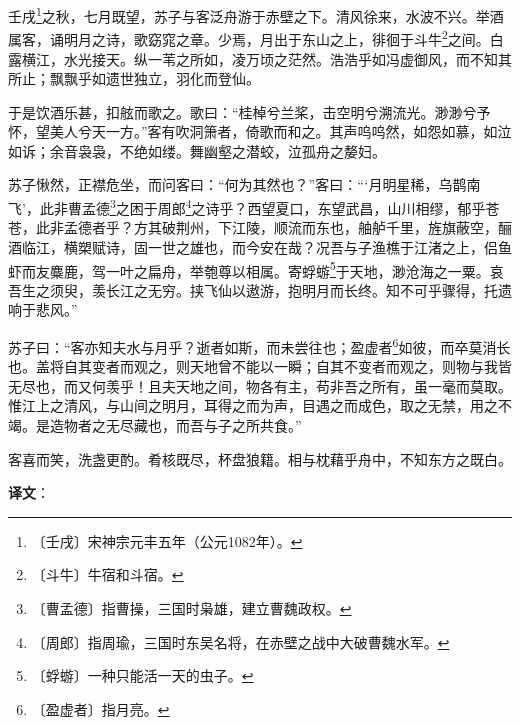 \documentclass[12pt,UTF-8,openany,a4]{ctexbook}
\begin{document}
\begin{large}
    
    壬戌\footnote{〔壬戌〕\yiwen 宋神宗元丰五年（公元1082年）。}之秋，七月既望，苏子与客泛舟游于赤壁之下。清风徐来，水波不兴。举酒属客，诵明月之诗，歌窈窕之章。少焉，月出于东山之上，徘徊于斗牛\footnote{〔斗牛〕\yiwen 牛宿和斗宿。}之间。白露横江，水光接天。纵一苇之所如，凌万顷之茫然。浩浩乎如冯虚御风，而不知其所止；飘飘乎如遗世独立，羽化而登仙。
    
    于是饮酒乐甚，扣舷而歌之。歌曰：“桂棹兮兰桨，击空明兮溯流光。渺渺兮予怀，望美人兮天一方。”客有吹洞箫者，倚歌而和之。其声呜呜然，如怨如慕，如泣如诉；余音袅袅，不绝如缕。舞幽壑之潜蛟，泣孤舟之嫠妇。
    
    苏子愀然，正襟危坐，而问客曰：“何为其然也？”客曰：“‘月明星稀，乌鹊南飞’，此非曹孟德\footnote{〔曹孟德〕\yiwen 指曹操，三国时枭雄，建立曹魏政权。}之困于周郎\footnote{〔周郎〕\yiwen 指周瑜，三国时东吴名将，在赤壁之战中大破曹魏水军。}之诗乎？西望夏口，东望武昌，山川相缪，郁乎苍苍，此非孟德者乎？方其破荆州，下江陵，顺流而东也，舳舻千里，旌旗蔽空，酾酒临江，横槊赋诗，固一世之雄也，而今安在哉？况吾与子渔樵于江渚之上，侣鱼虾而友麋鹿，驾一叶之扁舟，举匏尊以相属。寄蜉蝣\footnote{〔蜉蝣〕\yiwen 一种只能活一天的虫子。}于天地，渺沧海之一粟。哀吾生之须臾，羡长江之无穷。挟飞仙以遨游，抱明月而长终。知不可乎骤得，托遗响于悲风。”
    
    苏子曰：“客亦知夫水与月乎？逝者如斯，而未尝往也；盈虚者\footnote{〔盈虚者〕\yiwen 指月亮。}如彼，而卒莫消长也。盖将自其变者而观之，则天地曾不能以一瞬；自其不变者而观之，则物与我皆无尽也，而又何羡乎！且夫天地之间，物各有主，苟非吾之所有，虽一毫而莫取。惟江上之清风，与山间之明月，耳得之而为声，目遇之而成色，取之无禁，用之不竭。是造物者之无尽藏也，而吾与子之所共食。”
    
    客喜而笑，洗盏更酌。肴核既尽，杯盘狼籍。相与枕藉乎舟中，不知东方之既白。

\end{large}


\newpage

\begin{Large}
   \noindent \textbf{译文}：
\end{Large}

\vspace{1em}
\end{document}
